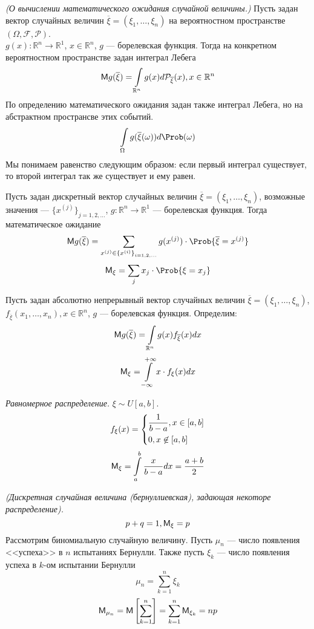\begin{theorem} \textit{(О вычислении математического ожидания случайной величины.)} Пусть задан вектор случайных величин $\overline{\xi} = (\xi_1, \ldots, \xi_n)$ на вероятностном пространстве $(\Omega, \mathcal{F}, \mathcal{P})$. \\
$g(x) : \mathbb{R}^n \to \mathbb{R}^1$, $x \in \mathbb{R}^n$, $g$ --- борелевская функция. Тогда на конкретном вероятностном пространстве задан интеграл Лебега
\[
  \mathsf{M} g(\overline\xi) = \int\limits_{\mathbb{R}^n} g(x) d \mathcal{P}_{\overline{\xi}} (x), x \in \mathbb{R}^n
\]
По определению математического ожидания задан также интеграл Лебега, но на абстрактном пространсве этих событий.
\[
  \int\limits_{\Omega} g (\overline{\xi}(\omega)) d \Prob (\omega)
\]
Мы понимаем равенство следующим образом: если первый интеграл существует, то второй интеграл так же существует и ему равен.
\end{theorem}
\begin{conclusion}
  Пусть задан дискретный вектор случайных величин $\overline{\xi} = (\xi_1, \ldots, \xi_n)$, возможные значения --- ${\{ x^{(j)} \}}_{j = 1, 2, \ldots} $,
  $g : \mathbb{R}^n \to \mathbb{R}^1$ --- борелевская функция. Тогда математическое ожидание
  \[
    \MExpect g(\overline{\xi}) = \sum\limits_{x^{(j)} \in {\{ x^{(i)} \}}_{i = 1, 2, \ldots}} g(x^{(j)}) \cdot \Prob \{ \overline{\xi} = x^{(j)} \}
  \]
  \[
    \MExpect_{\xi} = \sum\limits_j x_j \cdot \Prob \{ \xi = x_j \}
  \]
\end{conclusion}
\begin{conclusion}
  Пусть задан абсолютно непрерывный вектор случайных величин $\overline{\xi} = (\xi_1, \ldots, \xi_n)$, $f_{\overline{\xi}}(x_1, \ldots, x_n), x \in \mathbb{R}^n$, $g$ --- борелевская функция. Определим:
  \[
    \mathsf{M} g(\overline{\xi}) = \int\limits_{\mathbb{R}^n} g(x) f_{\overline{\xi}} (x) dx
  \]
  \[
    \mathsf{M}_{\xi} = \int\limits_{-\infty}^{+\infty} x \cdot f_{\xi} (x) dx
  \]
\end{conclusion}
\begin{example} \textit{Равномерное распределение.}
  $\xi \sim U [a, b]$.
  \[
    f_{\xi} (x) = \begin{dcases*}
    \frac{1}{b-a}, x \in [a, b] \\
    0, x \not\in [a, b]
  \end{dcases*}
  \]
  \[
    \mathsf{M}_{\xi} = \int\limits_a^b \frac{x}{b-a} dx = \frac{a+b}{2}
  \]
\end{example}
\begin{example} \textit{(Дискретная случайная величина (бернуллиевская), задающая некоторе распределение).}
  \[
    p + q = 1, \mathsf{M}_{\xi} = p
  \]
  Рассмотрим биномиальную случайную величину. Пусть $\mu_n$ --- число появления <<успеха>> в $n$ испытаниях Бернулли. Также пусть $\xi_k$ --- число появления успеха в $k$-ом испытании Бернулли
  \[
    \mu_n = \sum\limits_{k = 1}^n \xi_k
  \]
  \[
    \mathsf{M}_{\mu_n} = \mathsf{M} \left[ \sum\limits_{k = 1}^n \right] = \sum\limits_{k = 1}^n \mathsf{M}_{\xi_k} = np
  \]
\end{example}
